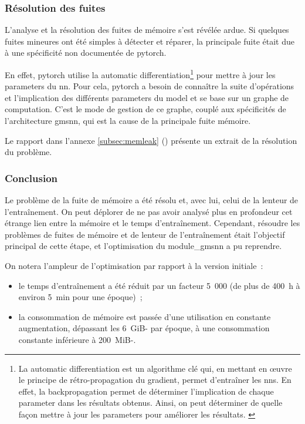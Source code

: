 \subsubsection{Résolution des fuites}
L'analyse et la résolution des fuites de mémoire s'est révélée ardue. Si quelques fuites mineures ont été simples à détecter et réparer, la principale fuite était due à une spécificité non documentée de \gls{pytorch}.

En effet, \gls{pytorch} utilise la \gls{automatic differentiation}\footnote{
	La \gls{automatic differentiation} est un algorithme clé qui, en mettant en œuvre le principe de rétro-propagation du gradient, permet d'entraîner les \glspl{nn}.
	En effet, la \gls{backpropagation} permet de déterminer l'implication de chaque \gls{parameter} dans les résultats obtenus.
	Ainsi, on peut déterminer de quelle façon mettre à jour les \glspl{parameter} pour améliorer les résultats. \label{def:automatic differentiation} \label{def:backpropagation}}
pour mettre à jour les \glspl{parameter} du \gls{nn}.
Pour cela, \gls{pytorch} a besoin de connaître la suite d'opérations et l'implication des différents \glspl{parameter} du \gls{model} et se base sur un \og graphe de computation\fg{}.
C'est le mode de gestion de ce graphe, couplé aux spécificités de l'architecture \gls{gmsnn}, qui est la cause de la principale fuite mémoire.

Le rapport dans l'annexe \ref{subsec:memleak} () présente un extrait de la résolution du problème.

\subsubsection{Conclusion}
Le problème de la fuite de mémoire a été résolu et, avec lui, celui de la lenteur de l'entraînement.
On peut déplorer de ne pas avoir analysé plus en profondeur cet étrange lien entre la mémoire et le temps d'entraînement.
Cependant, résoudre les problèmes de fuites de mémoire et de lenteur de l'entraînement était l'objectif principal de cette étape, et l'optimisation du \gls{module_gmsnn} a pu reprendre.

On notera l'ampleur de l'optimisation par rapport à la version initiale~:
\begin{itemize}
	\item le temps d'entraînement a été réduit par un facteur 5~000 (de plus de 400~h à environ 5~min pour une époque)~;
	\item la consommation de mémoire est passée d'une utilisation en constante augmentation, dépassant les 6~\gls{GiB-} par époque, à une consommation constante inférieure à 200~\gls{MiB-}.
\end{itemize}\vspace{1em}